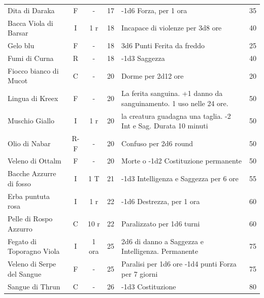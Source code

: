 \begin{tabularx}{\linewidth}{lcccXc}
	Dita di Daraka\index{Dita di Daraka} & F& - & 17& -1d6 Forza, per 1 ora & 35\\

	Bacca Viola di Barsar\index{Bacca Viola di Barsar}& I& 1 r& 18& Incapace di violenze per 3d8 ore& 40 \\

	Gelo blu \index{Gelo blu} & F& -& 18& 3d6 Punti Ferita da freddo& 25\\

	Fumi di Curna\index{Fumi di Curna} & R& - & 18& -1d3 Saggezza & 40\\

	Fiocco bianco di Mucot \index{Fiocco bianco di Mucot}& C& - & 20& Dorme per 2d12 ore& 20\\

	Lingua di Kreex \index{Lingua di Kreex} & F& - & 20& La ferita sanguina. +1 danno da sanguinamento. 1 uso nelle 24 ore. & 50 \\

	Muschio Giallo \index{Muschio Giallo}& I& 1 r& 20& la creatura guadagna una taglia. -2 Int e Sag. Durata 10 minuti& 50\\

	Olio di Nabar \index{Olio di Nabar}& R-F& - & 20& Confuso per 2d6 round& 50\\

	Veleno di Ottalm\index{Veleno di Ottalm}& F& - & 20& Morte o -1d2 Costituzione permanente& 50\\

	Bacche Azzurre di fosso \index{Bacche Azzurre di fosso}& I& 1 T& 21& -1d3 Intelligenza e Saggezza per 6 ore& 55\\

	Erba puntuta rosa \index{Erba puntuta rosa}& I& 1 r& 22& -1d6 Destrezza, per 1 ora& 60\\

	Pelle di Rospo Azzurro \index{Pelle di Rospo Azzurro}& C& 10 r & 22& Paralizzato per 1d6 turni& 60\\

	Fegato di Toporagno Viola \index{Fegato di Toporagno Viola} & I& 1 ora& 25& 2d6 di danno a Saggezza e Intelligenza. Permanente & 75 \\

	Veleno di Serpe del Sangue \index{Veleno di Serpe del Sangue} & F& - & 25& Paralisi per 1d6 ore -1d4 punti Forza per 7 giorni & 75\\

	Sangue di Thrun \index{Sangue di Thrun} & C& - & 26& -1d3 Costituzione & 80\\

\end{tabularx}

